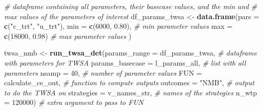 \documentclass[
]{article}
\newenvironment{Shaded}{\begin{snugshade}}{\end{snugshade}}
\newcommand{\CommentTok}[1]{\textcolor[rgb]{0.56,0.35,0.01}{\textit{#1}}}
\newcommand{\DataTypeTok}[1]{\textcolor[rgb]{0.13,0.29,0.53}{#1}}
\newcommand{\DecValTok}[1]{\textcolor[rgb]{0.00,0.00,0.81}{#1}}
\newcommand{\FloatTok}[1]{\textcolor[rgb]{0.00,0.00,0.81}{#1}}
\newcommand{\KeywordTok}[1]{\textcolor[rgb]{0.13,0.29,0.53}{\textbf{#1}}}
\newcommand{\NormalTok}[1]{#1}
\newcommand{\StringTok}[1]{\textcolor[rgb]{0.31,0.60,0.02}{#1}}
\begin{document}
\begin{Shaded}
\begin{Highlighting}[]
\CommentTok{# dataframe containing all parameters, their basecase values, and the min and }
\CommentTok{# max values of the parameters of interest}
\NormalTok{df_params_twsa <-}\StringTok{ }\KeywordTok{data.frame}\NormalTok{(}\DataTypeTok{pars =} \KeywordTok{c}\NormalTok{(}\StringTok{"c_trt"}\NormalTok{, }\StringTok{"u_trt"}\NormalTok{),}
                             \DataTypeTok{min  =} \KeywordTok{c}\NormalTok{(}\DecValTok{6000}\NormalTok{, }\FloatTok{0.80}\NormalTok{),  }\CommentTok{# min parameter values}
                             \DataTypeTok{max  =} \KeywordTok{c}\NormalTok{(}\DecValTok{18000}\NormalTok{, }\FloatTok{0.98}\NormalTok{)  }\CommentTok{# max parameter values}
\NormalTok{                             )}

\NormalTok{twsa_nmb <-}\StringTok{ }\KeywordTok{run_twsa_det}\NormalTok{(}\DataTypeTok{params_range    =}\NormalTok{ df_params_twsa,    }\CommentTok{# dataframe with parameters for TWSA}
                         \DataTypeTok{params_basecase =}\NormalTok{ l_params_all,      }\CommentTok{# list with all parameters}
                         \DataTypeTok{nsamp           =} \DecValTok{40}\NormalTok{,                }\CommentTok{# number of parameter values}
                         \DataTypeTok{FUN             =}\NormalTok{ calculate_ce_out,  }\CommentTok{# function to compute outputs}
                         \DataTypeTok{outcomes        =} \StringTok{"NMB"}\NormalTok{,          }\CommentTok{# output to do the TWSA on}
                         \DataTypeTok{strategies      =}\NormalTok{ v_names_str,       }\CommentTok{# names of the strategies}
                         \DataTypeTok{n_wtp           =} \DecValTok{120000}\NormalTok{)            }\CommentTok{# extra argument to pass to FUN}
\end{Highlighting}
\end{Shaded}
\end{document}
